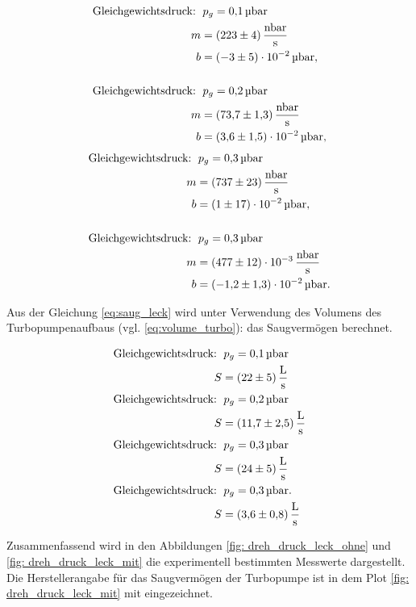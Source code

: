 \begin{align*}
  \text{Gleichgewichtsdruck: } &\, p_g=\SI{0.1}{\micro\bar} \\
  m&= \SI{223\pm 4}{\nano\bar\per\second}\\
  b&=\SI{-3\pm5 e-2}{\micro\bar},\\
  \\
  \text{Gleichgewichtsdruck: } &\, p_g=\SI{0.2}{\micro\bar} \\
  m&= \SI{73.7\pm 1.3 }{\nano\bar\per\second}\\
  b&=\SI{3.6\pm 1.5 e-2}{\micro\bar},\\
\end{align*}
\begin{align*}
  \text{Gleichgewichtsdruck: } &\, p_g=\SI{0.3}{\micro\bar} \\
  m&= \SI{737\pm 23 }{\nano\bar\per\second}\\
  b&=\SI{1\pm 17 e-2}{\micro\bar},\\
  \\
  \text{Gleichgewichtsdruck: } &\, p_g=\SI{0.3}{\micro\bar} \\
  m&= \SI{477\pm 12 e-3 }{\nano\bar\per\second}\\
  b&=\SI{-1.2\pm 1.3 e-2}{\micro\bar}.\\
\end{align*}

Aus der Gleichung \eqref{eq:saug_leck} wird unter Verwendung des Volumens des Turbopumpenaufbaus (vgl. \eqref{eq:volume_turbo}):
das Saugvermögen berechnet.

\begin{align*}
  \text{Gleichgewichtsdruck: } &\, p_g=\SI{0.1}{\micro\bar} \\
  S&=\SI{22\pm 5}{\litre\per\second}
  \\
  \text{Gleichgewichtsdruck: } &\, p_g=\SI{0.2}{\micro\bar} \\
  S&=\SI{11.7\pm 2.5}{\litre\per\second}
  \\
  \text{Gleichgewichtsdruck: } &\, p_g=\SI{0.3}{\micro\bar} \\
  S&=\SI{24\pm 5}{\litre\per\second}
  \\
  \text{Gleichgewichtsdruck: } &\, p_g=\SI{0.3}{\micro\bar}. \\
  S&=\SI{3.6\pm 00.8}{\litre\per\second}
\end{align*}

Zusammenfassend wird in den Abbildungen \ref{fig: dreh_druck_leck_ohne} und \ref{fig: dreh_druck_leck_mit} die experimentell bestimmten Messwerte
dargestellt. Die Herstellerangabe für das Saugvermögen der Turbopumpe ist in dem Plot \ref{fig: dreh_druck_leck_mit}
mit eingezeichnet.

